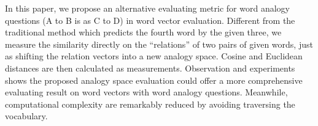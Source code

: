 In this paper, we propose an alternative evaluating metric for word analogy questions (A to B is as C to D) in word vector evaluation. Different from the traditional method which predicts the fourth word by the given three, we measure the similarity directly on the ``relations'' of two pairs of given words, just as shifting the relation vectors into a new analogy space. Cosine and Euclidean distances are then calculated as measurements. Observation and experiments shows the proposed analogy space evaluation could offer a more comprehensive evaluating result on word vectors with word analogy questions. Meanwhile, computational complexity are remarkably reduced by avoiding traversing the vocabulary.
